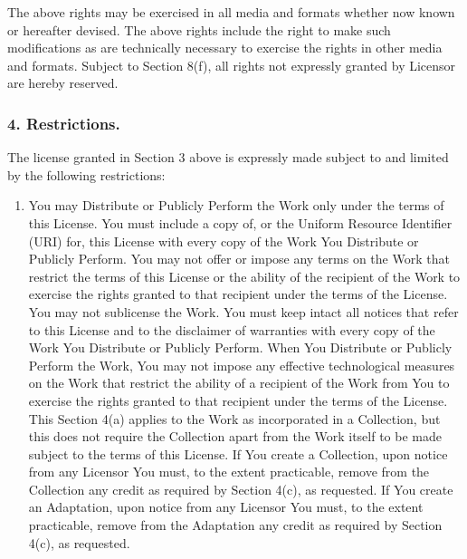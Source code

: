         The above rights may be exercised in all media and
        formats whether now known or hereafter devised. The above
        rights include the right to make such modifications as are
        technically necessary to exercise the rights in other media
        and formats. Subject to Section 8(f), all rights not
        expressly granted by Licensor are hereby reserved.

        \subsubsection{4. Restrictions.} The license granted in
        Section 3 above is expressly made subject to and limited by
        the following restrictions:

\begin{enumerate}
          \item You may Distribute or Publicly Perform the Work only
          under the terms of this License. You must include a copy
          of, or the Uniform Resource Identifier (URI) for, this
          License with every copy of the Work You Distribute or
          Publicly Perform. You may not offer or impose any terms
          on the Work that restrict the terms of this License or
          the ability of the recipient of the Work to exercise the
          rights granted to that recipient under the terms of the
          License. You may not sublicense the Work. You must keep
          intact all notices that refer to this License and to the
          disclaimer of warranties with every copy of the Work You
          Distribute or Publicly Perform. When You Distribute or
          Publicly Perform the Work, You may not impose any
          effective technological measures on the Work that
          restrict the ability of a recipient of the Work from You
          to exercise the rights granted to that recipient under
          the terms of the License. This Section 4(a) applies to
          the Work as incorporated in a Collection, but this does
          not require the Collection apart from the Work itself to
          be made subject to the terms of this License. If You
          create a Collection, upon notice from any Licensor You
          must, to the extent practicable, remove from the
          Collection any credit as required by Section 4(c), as
          requested. If You create an Adaptation, upon notice from
          any Licensor You must, to the extent practicable, remove
          from the Adaptation any credit as required by Section
          4(c), as requested.


\end{enumerate}
